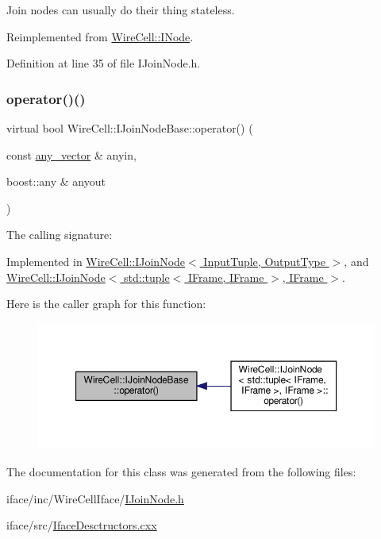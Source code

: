 Join nodes can usually do their thing stateless. 



Reimplemented from \hyperlink{class_wire_cell_1_1_i_node_a87d2b7293da4f6955e389ac6a2011306}{Wire\+Cell\+::\+I\+Node}.



Definition at line 35 of file I\+Join\+Node.\+h.

\mbox{\label{class_wire_cell_1_1_i_join_node_base_a8d90a969ef56dbb0731e70b05a9d06f8}} 
\subsubsection{\texorpdfstring{operator()()}{operator()()}}
{\footnotesize\ttfamily virtual bool Wire\+Cell\+::\+I\+Join\+Node\+Base\+::operator() (\begin{DoxyParamCaption}\item[{const \hyperlink{class_wire_cell_1_1_i_join_node_base_a5d53e0f00c30b472677c399c7d358fa3}{any\+\_\+vector} \&}]{anyin,  }\item[{boost\+::any \&}]{anyout }\end{DoxyParamCaption})\hspace{0.3cm}{\ttfamily [pure virtual]}}



The calling signature\+: 



Implemented in \hyperlink{class_wire_cell_1_1_i_join_node_ab807b2f2f3abbfedc1c1292f8a9cd617}{Wire\+Cell\+::\+I\+Join\+Node$<$ Input\+Tuple, Output\+Type $>$}, and \hyperlink{class_wire_cell_1_1_i_join_node_ab807b2f2f3abbfedc1c1292f8a9cd617}{Wire\+Cell\+::\+I\+Join\+Node$<$ std\+::tuple$<$ I\+Frame, I\+Frame $>$, I\+Frame $>$}.

Here is the caller graph for this function\+:
\nopagebreak
\begin{figure}[H]
\begin{center}
\leavevmode
\includegraphics[width=350pt]{class_wire_cell_1_1_i_join_node_base_a8d90a969ef56dbb0731e70b05a9d06f8_icgraph}
\end{center}
\end{figure}


The documentation for this class was generated from the following files\+:\begin{DoxyCompactItemize}
\item 
iface/inc/\+Wire\+Cell\+Iface/\hyperlink{_i_join_node_8h}{I\+Join\+Node.\+h}\item 
iface/src/\hyperlink{_iface_desctructors_8cxx}{Iface\+Desctructors.\+cxx}\end{DoxyCompactItemize}
